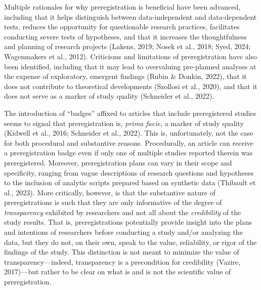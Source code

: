 \documentclass[authordate, empirical]{jote-new-article}
\begin{document}
	Multiple rationales for why preregistration is beneficial have been advanced, including that it helps distinguish between data-independent and data-dependent tests, reduces the opportunity for questionable research practices, facilitates conducting severe tests of hypotheses, and that it increases the thoughtfulness and planning of research projects (Lakens, 2019; Nosek et al., 2018; Syed, 2024; Wagenmakers et al., 2012). Criticisms and limitations of preregistration have also been identified, including that it may lead to overvaluing pre-planned analyses at the expense of exploratory, emergent findings (Rubin \& Donkin, 2022), that it does not contribute to theoretical developments (Szollosi et al., 2020), and that it does not serve as a marker of study quality (Schneider et al., 2022).



	The introduction of “badges” affixed to articles that include preregistered studies seems to signal that preregistration is, \emph{prima facie,} a marker of study quality (Kidwell et al., 2016; Schneider et al., 2022). This is, unfortunately, not the case for both procedural and substantive reasons. Procedurally, an article can receive a preregistration badge even if only one of multiple studies reported therein was preregistered. Moreover, preregistration plans can vary in their scope and specificity, ranging from vague descriptions of research questions and hypotheses to the inclusion of analytic scripts prepared based on synthetic data (Thibault et al., 2023). More critically, however, is that the substantive nature of preregistrations is such that they are only informative of the degree of \emph{transparency} exhibited by researchers and not all about the \emph{credibility} of the study results. That is, preregistrations potentially provide insight into the plans and intentions of researchers before conducting a study and/or analyzing the data, but they do not, on their own, speak to the value, reliability, or rigor of the findings of the study. This distinction is not meant to minimize the value of transparency—indeed, transparency is a precondition for credibility (Vazire, 2017)—but rather to be clear on what is and is not the scientific value of preregistration.
\end{document}
